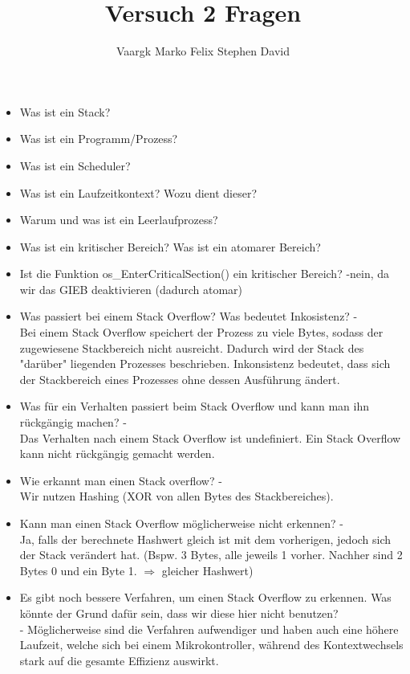 \documentclass[12pt]{article}
\title{Versuch 2 Fragen}
\author{Vaargk Marko Felix Stephen David}
\begin{document}
\maketitle

\begin{itemize}
\item Was ist ein Stack?
\item Was ist ein Programm/Prozess?
\item Was ist ein Scheduler?
\item Was ist ein Laufzeitkontext? Wozu dient dieser?
\item Warum und was ist ein Leerlaufprozess?
\item Was ist ein kritischer Bereich? Was ist ein atomarer Bereich?
\item Ist die Funktion os\_EnterCriticalSection() ein kritischer Bereich? -nein, da wir das GIEB deaktivieren (dadurch atomar)
\item Was passiert bei einem Stack Overflow? Was bedeutet Inkosistenz? -\\
      Bei einem Stack Overflow speichert der Prozess zu viele Bytes, sodass der zugewiesene Stackbereich nicht ausreicht. Dadurch wird der Stack des "darüber" liegenden Prozesses beschrieben. Inkonsistenz bedeutet, dass sich der Stackbereich eines Prozesses ohne dessen Ausführung ändert.
\item Was für ein Verhalten passiert beim Stack Overflow und kann man ihn rückgängig machen? -\\
      Das Verhalten nach einem Stack Overflow ist undefiniert. Ein Stack Overflow kann nicht rückgängig gemacht werden.
\item Wie erkannt man einen Stack overflow? -\\
      Wir nutzen Hashing (XOR von allen Bytes des Stackbereiches).
\item Kann man einen Stack Overflow möglicherweise nicht erkennen? -\\
      Ja, falls der berechnete Hashwert gleich ist mit dem vorherigen, jedoch sich der Stack verändert hat. (Bspw. 3 Bytes, alle jeweils 1 vorher. Nachher sind 2 Bytes 0 und ein Byte 1. $\Rightarrow$ gleicher Hashwert)
\item Es gibt noch bessere Verfahren, um einen Stack Overflow zu erkennen. Was könnte der Grund dafür sein, dass wir diese hier nicht benutzen?\\-
      Möglicherweise sind die Verfahren aufwendiger und haben auch eine höhere Laufzeit, welche sich bei einem Mikrokontroller, während des Kontextwechsels stark auf die gesamte Effizienz auswirkt.

\end{itemize}
\end{document}

